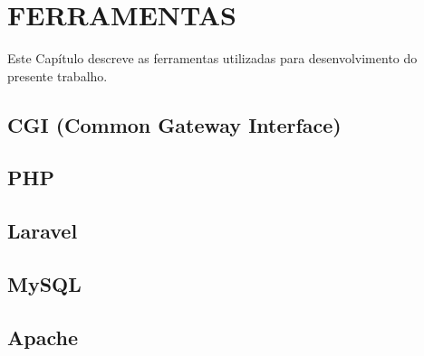 
\chapter{FERRAMENTAS}
Este Capítulo descreve as ferramentas utilizadas para desenvolvimento do presente trabalho.


\section{CGI (Common Gateway Interface)}


\section{PHP}


\section{Laravel}


\section{MySQL}


\newpage
\section{Apache}
